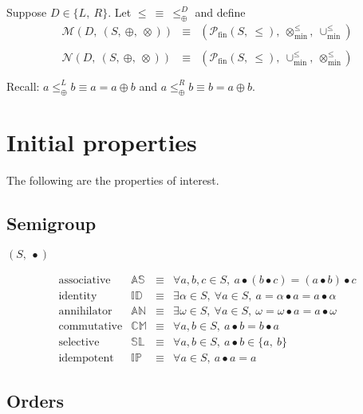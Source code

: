 \documentclass[10pt]{article}
\newcommand{\propname}[1]{{\mathbb{#1}}}
\newcommand{\minunion}{\cup_{\min}^{\leq}}
\begin{document}
Suppose $D \in \{L,\ R\}$. 
Let $\leq \ \equiv \ \leq_\oplus^{D}$ and define 
\[
\begin{array}{rcl} 
\mathcal{M}(D,\ (S,\ \oplus,\ \otimes))   
   & \equiv 
   & (\mathcal{P}_{\mathrm{fin}}(S,\ \leq),\ \otimes_{\min}^{\leq},\ \minunion)\\
\\
\mathcal{N}(D,\ (S,\ \oplus,\ \otimes))   
   & \equiv 
   & (\mathcal{P}_{\mathrm{fin}}(S,\ \leq),\ \minunion,\ \otimes_{\min}^{\leq})\\
\\
\end{array} 
\] 
Recall: $a \leq_\oplus^{L} b \equiv a = a\oplus b$ 
and $a \leq_\oplus^{R} b \equiv b = a\oplus b$.

\section{Initial properties} 

The following are the properties of interest.
\subsection{Semigroup}
$(S,\ \bullet)$

\[ 
\begin{array}{c|ccl} 
\mbox{associative} 
   & \propname{AS} 
   & \equiv 
   & \forall a, b, c \in S,\ a \bullet (b \bullet c) = (a \bullet b) \bullet c 
   \\ 
\mbox{identity}    
   & \propname{ID} 
   & \equiv 
   & \exists \alpha\in S,\ \forall a\in S,\ a = \alpha \bullet a = a \bullet \alpha
   \\ 
\mbox{annihilator} 
   & \propname{AN} 
   & \equiv 
   & \exists \omega\in S,\ \forall a\in S,\ \omega = \omega \bullet a = a \bullet \omega
   \\ 
\mbox{commutative} 
   & \propname{CM} 
   & \equiv 
   & \forall a, b \in S,\ a\bullet b =  b\bullet a
   \\
\mbox{selective}   
   & \propname{SL} 
   & \equiv 
   & \forall a, b \in S,\ a\bullet b  \in  \{a,\ b\} 
   \\ 
\mbox{idempotent}  
   & \propname{IP} 
   & \equiv 
   & \forall a \in S,\ a\bullet a  =  a
\end{array} 
\] 

\subsection{Orders}
\end{document}
